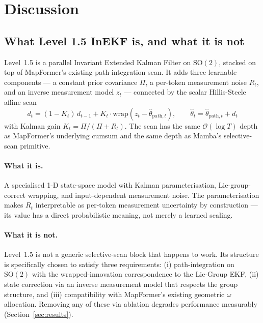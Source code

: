 \section{Discussion}
\label{sec:discussion}

\subsection{What Level 1.5 InEKF is, and what it is not}

Level~1.5 is a parallel Invariant Extended Kalman Filter on
$\mathrm{SO}(2)$, stacked on top of MapFormer's existing path-integration
scan. It adds three learnable components --- a constant prior covariance
$\Pi$, a per-token measurement noise $R_t$, and an inverse measurement
model $z_t$ --- connected by the scalar Hillis-Steele affine scan
\begin{equation}
  d_t = (1 - K_t) \, d_{t-1} + K_t \cdot \mathrm{wrap}(z_t - \hat\theta_{\mathrm{path},t}),
  \qquad
  \hat\theta_t = \hat\theta_{\mathrm{path},t} + d_t
\end{equation}
with Kalman gain $K_t = \Pi / (\Pi + R_t)$. The scan has the same
$\mathcal{O}(\log T)$ depth as MapFormer's underlying cumsum and the
same depth as Mamba's selective-scan primitive.

\paragraph{What it is.} A specialised 1-D state-space model with Kalman
parameterisation, Lie-group-correct wrapping, and input-dependent
measurement noise. The parameterisation makes $R_t$ interpretable as
per-token measurement uncertainty by construction --- its value has a
direct probabilistic meaning, not merely a learned scaling.

\paragraph{What it is not.} Level~1.5 is not a generic selective-scan
block that happens to work. Its structure is specifically chosen to
satisfy three requirements: (i) path-integration on $\mathrm{SO}(2)$
with the \citet{markovic2017wrapping} wrapped-innovation correspondence
to the Lie-Group EKF, (ii) state correction via an inverse measurement
model that respects the group structure, and (iii) compatibility with
MapFormer's existing geometric $\omega$ allocation. Removing any of
these via ablation degrades performance measurably
(Section~\ref{sec:results}).

